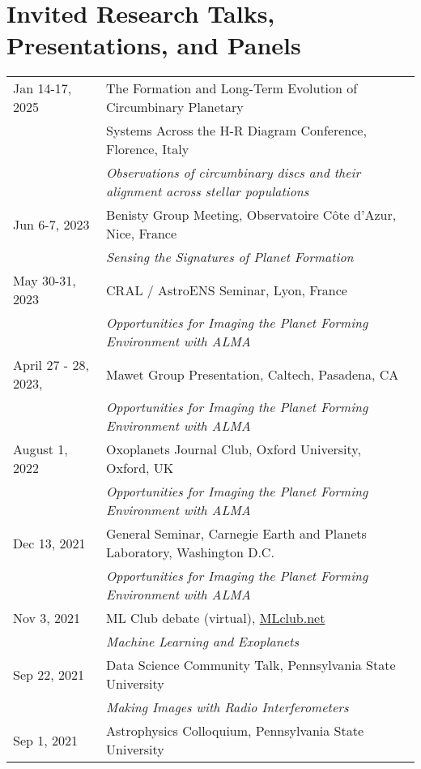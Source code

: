 \section*{Invited Research Talks, Presentations, and Panels}
\setlength\LTleft{0pt}
\setlength\LTright{0pt}
\begin{longtable}{@{\hspace{10pt}}p{1.2in}l}
  Jan 14-17, 2025 & The Formation and Long-Term Evolution of Circumbinary Planetary\\
  & Systems Across the H-R Diagram Conference, Florence, Italy \\
  & \emph{Observations of circumbinary discs and their alignment across stellar populations}\\[\rowskip]
  Jun 6-7, 2023 & Benisty Group Meeting, Observatoire C\^{o}te d'Azur, Nice, France \\
  & \emph{Sensing the Signatures of Planet Formation} \\[\rowskip] 
  May 30-31, 2023 & CRAL / AstroENS Seminar, Lyon, France \\[\rowskip] 
  & \emph{Opportunities for Imaging the Planet Forming Environment with ALMA}\\[\rowskip] 
  April 27 - 28, 2023, & Mawet Group Presentation, Caltech, Pasadena, CA \\
  & \emph{Opportunities for Imaging the Planet Forming Environment with ALMA}\\[\rowskip] 
  August 1, 2022 & Oxoplanets Journal Club, Oxford University, Oxford, UK\\
  & \emph{Opportunities for Imaging the Planet Forming Environment with ALMA}\\[\rowskip] 
  Dec 13, 2021 & General Seminar, Carnegie Earth and Planets Laboratory, Washington D.C. \\
  & \emph{Opportunities for Imaging the Planet Forming Environment with ALMA} \\[\rowskip]
  Nov 3, 2021 & ML Club debate (virtual), \href{https://docs.google.com/document/d/1GGtE-YIuAWlmpKSr38_kyiF-Fklszhkh4FkiYWzBAho/pub}{MLclub.net} \\
  & \emph{Machine Learning and Exoplanets}\\[\rowskip]
  Sep 22, 2021 & Data Science Community Talk, Pennsylvania State University\\
  & \emph{Making Images with Radio Interferometers} \\[\rowskip]
  Sep 1, 2021 & Astrophysics Colloquium, Pennsylvania State University\\

\end{longtable}
